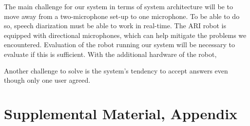 \documentclass[hidelinks, 11pt]{article}
\begin{document}
The main challenge for our system in terms of system architecture will be to move away from a two-microphone set-up to one microphone. To be able to do so, speech diarization must be able to work in real-time. The ARI robot is equipped with directional microphones, which can help mitigate the problems we encountered. Evaluation of the robot running our system will be necessary to evaluate if this is sufficient. With the additional hardware of the robot,

Another challenge to solve is the system's tendency to accept answers even though only one user agreed. %

%
%



\appendix

\section{Supplemental Material, Appendix}
\label{sec:supplemental}
\end{document}
